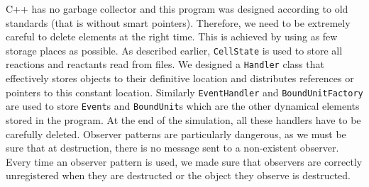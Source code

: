 C++ has no garbage collector and this program was designed according to old standards (that is without smart pointers).
Therefore, we need to be extremely careful to delete elements at the right time.
This is achieved by using as few storage places as possible.
As described earlier, \texttt{CellState} is used to store all reactions and reactants read from files.
We designed a \texttt{Handler} class that effectively stores objects
to their definitive location and distributes references or pointers to this constant location.
Similarly \texttt{EventHandler} and \texttt{BoundUnitFactory} are used
to store \texttt{Event}s and \texttt{BoundUnit}s which are the other dynamical elements stored in the program.
At the end of the simulation, all these handlers have to be carefully deleted.
Observer patterns are particularly dangerous, as we must be sure that at destruction,
there is no message sent to a non-existent observer.
Every time an observer pattern is used, we made sure that observers are correctly unregistered
when they are destructed or the object they observe is destructed.
